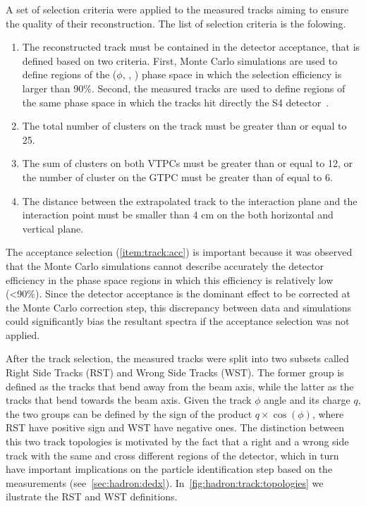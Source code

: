 
A set of selection criteria were
applied to the measured tracks aiming to
ensure the quality of their reconstruction. 
The list of selection criteria is the folowing.
\begin{enumerate}[label=(\roman*)]
\item The reconstructed track must be contained in the detector acceptance,
  that is defined based on two criteria. First,
  Monte Carlo simulations are used to define regions of the ($\phi$, \pp, \pT)
  phase space in which the selection efficiency is larger than 90\%. Second,
  the measured tracks are used to define regions of the same phase space in
  which the tracks hit directly the S4 detector~\cite{MartinThesis}. \label{item:track:acc} 
\item The total number of clusters on the track must be greater than or equal to 25.
\item The sum of clusters on both VTPCs must be greater than or equal to 12, or
  the number of cluster on the GTPC must be greater than of equal to 6.
\item The distance between the extrapolated track to the interaction plane and the
  interaction point must be smaller than 4 cm on the both horizontal and vertical plane.
\end{enumerate}

The acceptance selection (\cref{item:track:acc}) is important because
it was observed that the Monte Carlo simulations cannot describe
accurately the detector efficiency in the phase space regions
in which this efficiency is relatively low (<90\%). Since the detector
acceptance is the dominant effect to be corrected at the Monte Carlo
correction step, this discrepancy between data and simulations
could significantly bias the resultant spectra if the acceptance selection
was not applied.

After the track selection, the measured tracks were split
into two subsets called Right Side Tracks (RST) and Wrong Side Tracks (WST).
The former group is defined as the tracks that bend away from the
beam axis, while the latter as the tracks that bend towards the beam axis.
Given the track $\phi$ angle and its charge $q$, the two groups
can be defined by the sign of the product $q \times \cos(\phi)$, where
RST have positive sign and WST have negative ones.
The distinction between this two track topologies is motivated by the
fact that a right and a wrong side track with the same \pp and
\pT cross different regions of the detector, 
which in turn have important implications on the
particle identification step based on the \dedx measurements
(see~\cref{sec:hadron:dedx}). 
In~\cref{fig:hadron:track:topologies} we ilustrate the
RST and WST definitions.

